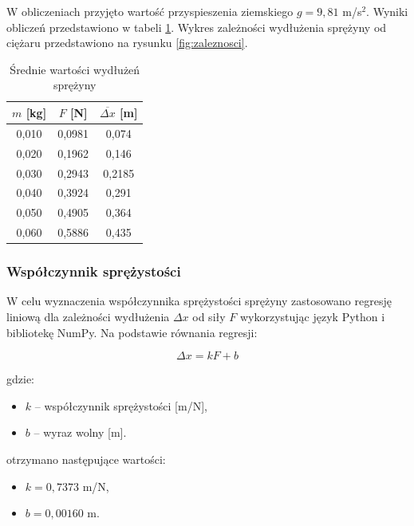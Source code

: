 \documentclass[a4paper,12pt]{article}
\begin{document}
W obliczeniach przyjęto wartość przyspieszenia ziemskiego $g = 9,81$ m/s$^2$.
Wyniki obliczeń przedstawiono w tabeli \ref{tab:wydluzenia}.
Wykres zależności wydłużenia sprężyny od ciężaru przedstawiono na rysunku \ref{fig:zaleznosci}.

\begin{table}[H]
    \centering
    \begin{tabular}{|c|c|c|}
        \hline
        $m$ [kg] & $F$ [N] & $\overline{\Delta x}$ [m] \\
        \hline
        0,010 & 0,0981 & 0,074 \\
        0,020 & 0,1962 & 0,146 \\
        0,030 & 0,2943 & 0,2185 \\
        0,040 & 0,3924 & 0,291 \\
        0,050 & 0,4905 & 0,364 \\
        0,060 & 0,5886 & 0,435 \\
        \hline
    \end{tabular}
    \caption{Średnie wartości wydłużeń sprężyny}
    \label{tab:wydluzenia}
\end{table}

\subsubsection{Współczynnik sprężystości}

W celu wyznaczenia współczynnika sprężystości sprężyny zastosowano regresję liniową dla zależności wydłużenia $\Delta x$ od siły $F$ wykorzystując język Python i bibliotekę NumPy. Na podstawie równania regresji:

\begin{equation*}
    \Delta x = kF + b
\end{equation*}

gdzie:
\begin{itemize}
    \setlength{\itemsep}{0em}
    \item $k$ -- współczynnik sprężystości [m/N],
    \item $b$ -- wyraz wolny [m].
\end{itemize}

otrzymano następujące wartości:
\begin{itemize}
    \setlength{\itemsep}{0em}
    \item $k = 0,7373$ m/N,
    \item $b = 0,00160$ m.
\end{itemize}
\end{document}

